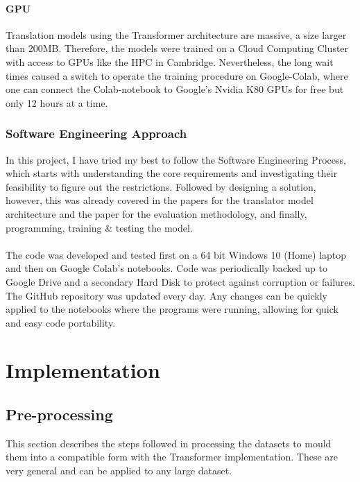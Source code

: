 \documentclass[12pt,a4paper,twoside,openright]{report}
\begin{document}
\subsubsection{GPU}
Translation models using the Transformer architecture are massive, a size larger than 200MB. Therefore, the models were trained on a Cloud Computing Cluster with access to GPUs like the HPC in Cambridge. Nevertheless, the long wait times caused a switch to operate the training procedure on Google-Colab, where one can connect the Colab-notebook to Google's Nvidia K80 GPUs for free but only 12 hours at a time.



\subsection{Software Engineering Approach}
\label{professional-approach}

In this project, I have tried my best to follow the Software Engineering Process, which starts with understanding the core requirements and investigating their feasibility to figure out the restrictions. Followed by designing a solution, however, this was already covered in the papers \cite{transformers} for the translator model architecture and the paper \cite{nguyen-daume-iii-2019-global} for the evaluation methodology, and finally, programming, training \& testing the model.
\\\\
The code was developed and tested first on a 64 bit Windows 10 (Home) laptop and then on Google Colab's notebooks. Code was periodically backed up to Google Drive and a secondary Hard Disk to protect against corruption or failures. The GitHub repository was updated every day. Any changes can be quickly applied to the notebooks where the programs were running, allowing for quick and easy code portability.



\chapter{Implementation}
\label{implementation}

\section{Pre-processing}
\label{pre-processing}
This section describes the steps followed in processing the datasets to mould them into a compatible form with the Transformer implementation. These are very general and can be applied to any large dataset.
\end{document}
